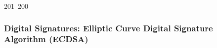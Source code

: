 201~200~\documentclass{article}
\begin{document}
	                                                                                                                                                                                                                                                                                                	                                                                                                                                        	    	                                                                                                	                                                                                                                                                                                                                                                                                                                                	                                                                        	                                                                        	                                                                                                                                        	                                                                                                                                                                                                                        	                                                                    \subsubsection{Digital Signatures: Elliptic Curve Digital Signature Algorithm (ECDSA)}
\end{document}
